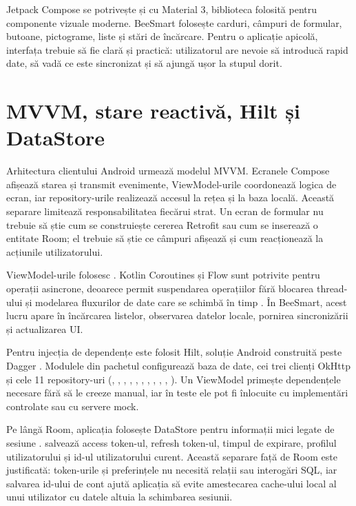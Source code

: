 Jetpack Compose se potrivește și cu Material 3, biblioteca folosită pentru componente vizuale moderne. BeeSmart folosește carduri, câmpuri de formular, butoane, pictograme, liste și stări de încărcare. Pentru o aplicație apicolă, interfața trebuie să fie clară și practică: utilizatorul are nevoie să introducă rapid date, să vadă ce este sincronizat și să ajungă ușor la stupul dorit.

\section{MVVM, stare reactivă, Hilt și DataStore}

Arhitectura clientului Android urmează modelul MVVM. Ecranele Compose afișează starea și transmit evenimente, ViewModel-urile coordonează logica de ecran, iar repository-urile realizează accesul la rețea și la baza locală. Această separare limitează responsabilitatea fiecărui strat. Un ecran de formular nu trebuie să știe cum se construiește cererea Retrofit sau cum se inserează o entitate Room; el trebuie să știe ce câmpuri afișează și cum reacționează la acțiunile utilizatorului.

ViewModel-urile folosesc . Kotlin Coroutines și Flow sunt potrivite pentru operații asincrone, deoarece permit suspendarea operațiilor fără blocarea thread-ului și modelarea fluxurilor de date care se schimbă în timp \cite{kotlinCoroutinesDocs}. În BeeSmart, acest lucru apare în încărcarea listelor, observarea datelor locale, pornirea sincronizării și actualizarea UI.

Pentru injecția de dependențe este folosit Hilt, soluție Android construită peste Dagger \cite{androidHiltDocs}. Modulele din pachetul  configurează baza de date, cei trei clienți OkHttp și cele 11 repository-uri (, , , , , , , , , , ). Un ViewModel primește dependențele necesare fără să le creeze manual, iar în teste ele pot fi înlocuite cu implementări controlate sau cu servere mock.

Pe lângă Room, aplicația folosește DataStore pentru informații mici legate de sesiune \cite{androidDataStoreDocs}.  salvează access token-ul, refresh token-ul, timpul de expirare, profilul utilizatorului și id-ul utilizatorului curent. Această separare față de Room este justificată: token-urile și preferințele nu necesită relații sau interogări SQL, iar salvarea id-ului de cont ajută aplicația să evite amestecarea cache-ului local al unui utilizator cu datele altuia la schimbarea sesiunii.

